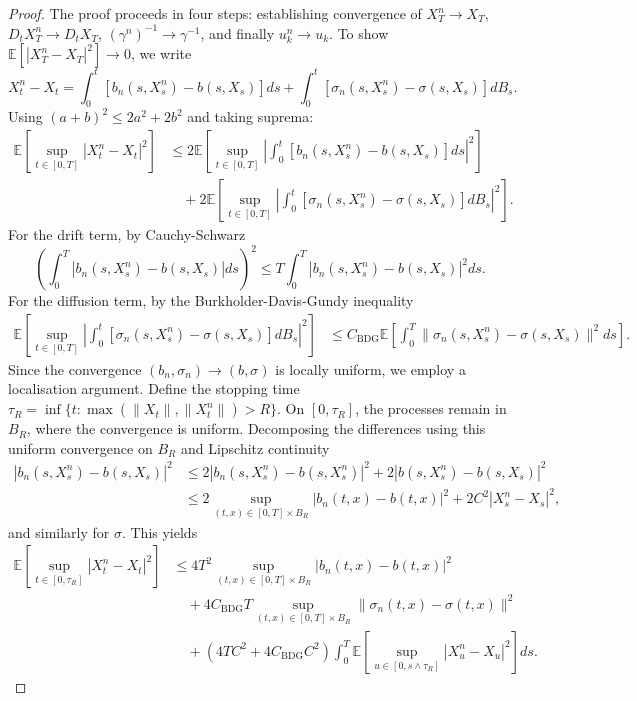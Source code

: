 \documentclass[]{interact}
\newcommand{\1}{\mathbf{1}}
\theoremstyle{plain}%
\theoremstyle{definition}
\theoremstyle{remark}
\numberwithin{equation}{section}
\begin{document}
\begin{proof}
The proof proceeds in four steps: establishing convergence of \(X_T^n \to X_T\), \(D_t X_T^n \to D_t X_T\), \((\gamma^n)^{-1} \to \gamma^{-1}\), and finally \(u_k^n \to u_k\).
%
To show \(\mathbb{E}[|X_T^n - X_T|^2] \to 0\), we write
\[
X_t^n - X_t = \int_0^t [b_n(s, X_s^n) - b(s, X_s)] ds + \int_0^t [\sigma_n(s, X_s^n) - \sigma(s, X_s)] dB_s.
\]
Using \((a + b)^2 \leq 2a^2 + 2b^2\) and taking suprema:
\begin{align*}
\mathbb{E}\left[\sup_{t \in [0,T]} |X_t^n - X_t|^2\right] &\leq 2\mathbb{E}\left[\sup_{t \in [0,T]} \left|\int_0^t [b_n(s, X_s^n) - b(s, X_s)] ds\right|^2\right] \\
&\quad + 2\mathbb{E}\left[\sup_{t \in [0,T]} \left|\int_0^t [\sigma_n(s, X_s^n) - \sigma(s, X_s)] dB_s\right|^2\right].
\end{align*}
%
For the drift term, by Cauchy-Schwarz
\[
\left(\int_0^T |b_n(s, X_s^n) - b(s, X_s)| ds\right)^2 \leq T \int_0^T |b_n(s, X_s^n) - b(s, X_s)|^2 ds.
\]
For the diffusion term, by the Burkholder-Davis-Gundy inequality
\begin{align*}
\mathbb{E}\left[\sup_{t \in [0,T]} \left|\int_0^t [\sigma_n(s, X_s^n) - \sigma(s, X_s)] dB_s\right|^2\right] &\leq C_{\mathrm{BDG}} \mathbb{E}\left[\int_0^T \|\sigma_n(s, X_s^n) - \sigma(s, X_s)\|^2 ds\right].
\end{align*}
%
Since the convergence \((b_n,\sigma_n)\to(b,\sigma)\) is locally uniform, we employ a localisation argument. Define the stopping time \(\tau_R = \inf\{t : \max(\|X_t\|, \|X_t^n\|) > R\}\). On \([0,\tau_R]\), the processes remain in \(B_R\), where the convergence is uniform. Decomposing the differences using this uniform convergence on \(B_R\) and Lipschitz continuity
\begin{align*}
|b_n(s, X_s^n) - b(s, X_s)|^2 &\leq 2|b_n(s, X_s^n) - b(s, X_s^n)|^2 + 2|b(s, X_s^n) - b(s, X_s)|^2 \\
&\leq 2\sup_{(t,x) \in [0,T] \times B_R} |b_n(t, x) - b(t, x)|^2 + 2C^2|X_s^n - X_s|^2,
\end{align*}
and similarly for \(\sigma\). This yields
\begin{align*}
\mathbb{E}\left[\sup_{t \in [0,\tau_R]} |X_t^n - X_t|^2\right] &\leq 4T^2 \sup_{(t,x) \in [0,T] \times B_R} |b_n(t, x) - b(t, x)|^2 \\
&\quad + 4C_{\mathrm{BDG}}T \sup_{(t,x) \in [0,T] \times B_R} \|\sigma_n(t, x) - \sigma(t, x)\|^2 \\
&\quad + (4TC^2 + 4C_{\mathrm{BDG}}C^2) \int_0^T \mathbb{E}\left[\sup_{u \in [0,s \wedge \tau_R]} |X_u^n - X_u|^2\right] ds.

\end{align*}
\end{proof}
\end{document}
